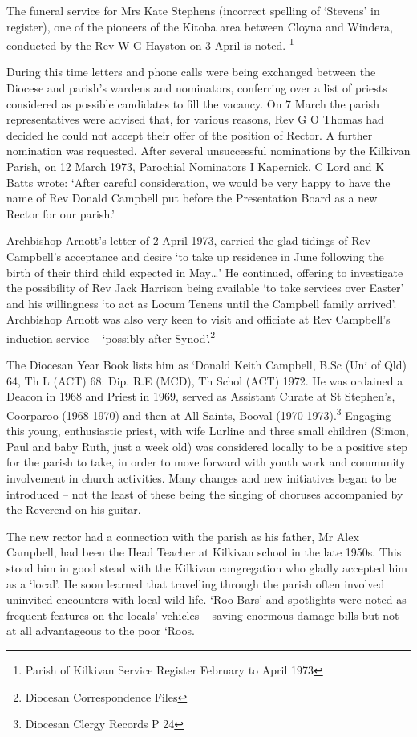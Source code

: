 The funeral service for Mrs Kate Stephens (incorrect spelling of `Stevens' in register), one of the pioneers of the Kitoba area between Cloyna and Windera, conducted by the Rev W G Hayston on 3 April is noted. \footnote{Parish of Kilkivan Service Register February to April 1973}

During this time letters and phone calls were being exchanged between the Diocese and parish's wardens and nominators, conferring over a list of priests considered as possible candidates to fill the vacancy. On 7 March the parish representatives were advised that, for various reasons, Rev G O Thomas had decided he could not accept their offer of the position of Rector. A further nomination was requested. After several unsuccessful nominations by the Kilkivan Parish, on 12 March 1973, Parochial Nominators I Kapernick, C Lord and K Batts wrote: `After careful consideration, we would be very happy to have the name of Rev Donald Campbell put before the Presentation Board as a new Rector for our parish.'

Archbishop Arnott's letter of 2 April 1973, carried the glad tidings of Rev Campbell's acceptance and desire `to take up residence in June following the birth of their third child expected in May\ldots' He continued, offering to investigate the possibility of Rev Jack Harrison being available `to take services over Easter' and his willingness `to act as Locum Tenens until the Campbell family arrived'. Archbishop Arnott was also very keen to visit and officiate at Rev Campbell's induction service -- `possibly after Synod'.\footnote{Diocesan Correspondence Files}

The Diocesan Year Book lists him as `Donald Keith Campbell, B.Sc (Uni of Qld) 64, Th L (ACT) 68: Dip. R.E (MCD), Th Schol (ACT) 1972. He was ordained a Deacon in 1968 and Priest in 1969, served as Assistant Curate at St Stephen's, Coorparoo (1968-1970) and then at All Saints, Booval (1970-1973).\footnote{Diocesan Clergy Records P 24} Engaging this young, enthusiastic priest, with wife Lurline and three small children (Simon, Paul and baby Ruth, just a week old) was considered locally to be a positive step for the parish to take, in order to move forward with youth work and community involvement in church activities. Many changes and new initiatives began to be introduced -- not the least of these being the singing of choruses accompanied by the Reverend on his guitar.

The new rector had a connection with the parish as his father, Mr Alex Campbell, had been the Head Teacher at Kilkivan school in the late 1950s. This stood him in good stead with the Kilkivan congregation who gladly accepted him as a `local'. He soon learned that travelling through the parish often involved uninvited encounters with local wild-life. `Roo Bars' and spotlights were noted as frequent features on the locals' vehicles -- saving enormous damage bills but not at all advantageous to the poor `Roos.

